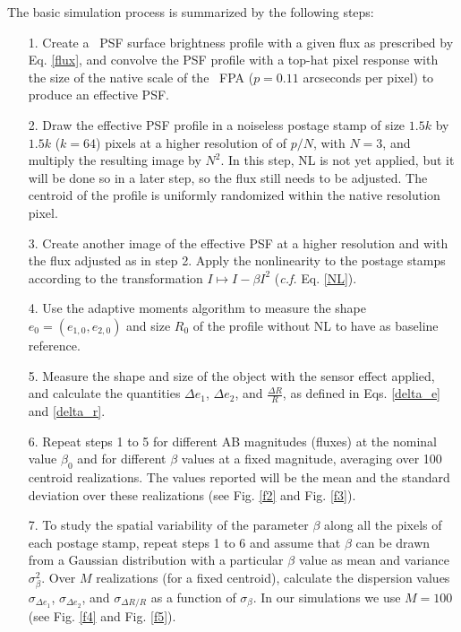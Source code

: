 \documentclass[11pt,preprint,flushrt]{aastex}
\begin{document}
The basic simulation process is summarized by the following steps:  
\begin{itemize}
\item[1.] Create a \wfa\ PSF surface brightness profile with a given flux as prescribed by Eq. \ref{flux}, and convolve the PSF profile with a top-hat pixel response with the size of the native scale of the \wfa\ FPA ($p=0.11$ arcseconds per pixel) to produce an effective PSF. 
\item[2.] Draw the effective PSF profile in a noiseless postage stamp of size $1.5k$ by $1.5k$ ($k=64$) pixels at a higher resolution of of $p/N$, with $N=3$, and multiply the resulting image by $N^2$. In this step, NL is not yet applied, but it will be done so in a later step, so the flux still needs to be adjusted. The centroid of the profile is uniformly randomized within the native resolution pixel.
\item[3.] Create another image of the effective PSF at a higher resolution and with the flux adjusted as in step 2. 
Apply the nonlinearity to the postage stamps according to the transformation $I \mapsto I - \beta I^2$ (\emph{c.f.} Eq. \ref{NL}).
\item[4.] Use the adaptive moments algorithm to measure the shape $e_0=(e_{1,0}, e_{2,0})$ and size $R_0$ of the profile without NL to have as baseline reference.
\item[5.] Measure the shape and size of the object with the sensor effect applied, and calculate the quantities $\Delta e_1$, $\Delta e_2$, and $\frac{\Delta R}{R}$, as defined in Eqs. \ref{delta_e} and \ref{delta_r}. 
\item [6.] Repeat steps 1 to 5 for different AB magnitudes (fluxes) at the nominal value $\beta_0$ and for different $\beta$ values at a fixed magnitude, averaging over 100 centroid realizations. The values reported will be the mean and the standard deviation over these realizations (see Fig. \ref{f2} and Fig. \ref{f3}).
\item[7.] To study the spatial variability of the parameter $\beta$ along all the pixels of each postage stamp, repeat steps 1 to 6 and assume that $\beta$ can be drawn from a Gaussian distribution with a particular $\beta$ value as mean and variance $\sigma_{\beta}^2$. Over $M$ realizations (for a fixed centroid), calculate the dispersion values $\sigma_{\Delta e_1}$, $\sigma_{\Delta e_2}$, and $\sigma_{\Delta R/R}$ as a function of $\sigma_{\beta}$. In our simulations we use $M=100$ (see Fig. \ref{f4} and Fig. \ref{f5}). 

\end{itemize}
\end{document}

